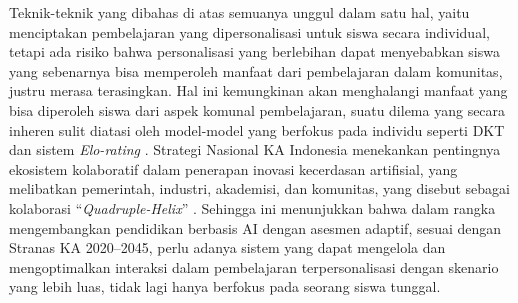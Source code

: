 \documentclass[12pt,a4paper,oneside]{book}
\begin{document}
Teknik-teknik yang dibahas di atas semuanya unggul dalam satu hal, yaitu menciptakan pembelajaran yang dipersonalisasi untuk siswa secara individual, tetapi ada risiko bahwa personalisasi yang berlebihan dapat menyebabkan siswa yang sebenarnya bisa memperoleh manfaat dari pembelajaran dalam komunitas, justru merasa terasingkan. Hal ini kemungkinan akan menghalangi manfaat yang bisa diperoleh siswa dari aspek komunal pembelajaran, suatu dilema yang secara inheren sulit diatasi oleh model-model yang berfokus pada individu seperti DKT dan sistem \textit{Elo-rating} \autocite{Halkiopoulos2024}. Strategi Nasional KA Indonesia menekankan pentingnya ekosistem kolaboratif dalam penerapan inovasi kecerdasan artifisial, yang melibatkan pemerintah, industri, akademisi, dan komunitas, yang disebut sebagai kolaborasi “\textit{Quadruple-Helix}” \autocite{BPPT2020}. Sehingga ini menunjukkan bahwa dalam rangka mengembangkan pendidikan berbasis AI dengan asesmen adaptif, sesuai dengan Stranas KA 2020--2045, perlu adanya sistem yang dapat mengelola dan mengoptimalkan interaksi dalam pembelajaran terpersonalisasi dengan skenario yang lebih luas, tidak lagi hanya berfokus pada seorang siswa tunggal.

\end{document}
